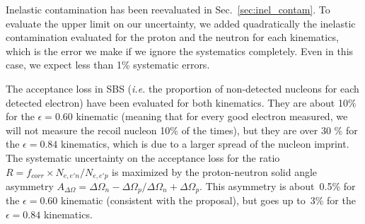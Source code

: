 Inelastic contamination has been reevaluated in Sec.~\ref{sec:inel_contam}. To evaluate the upper limit on our uncertainty, we added quadratically the inelastic contamination evaluated for the proton and the neutron for each kinematics, which is the error we make if we ignore the systematics completely. Even in this case, we expect less than 1\% systematic errors.

The acceptance loss in SBS ({\it i.e.} the proportion of non-detected nucleons for each detected electron) have been evaluated for both kinematics.
They are about 10\% for the $\epsilon = 0.60$ kinematic (meaning that for every good electron measured, we will not measure the recoil nucleon 10\% of the times), but they are over 30 \% for the $\epsilon= 0.84$ kinematics, which is due to a larger spread of the nucleon imprint.
The systematic uncertainty on the acceptance loss for the ratio $R = f_{corr} \times N_{e,e'n}/N_{e,e'p}$ is maximized by the proton-neutron solid angle asymmetry $A_{\Delta\Omega} = {\Delta\Omega_n-\Delta\Omega_p}/{\Delta\Omega_n+\Delta\Omega_p}$.
This asymmetry is about~0.5\% for the $\epsilon = 0.60$ kinematic (consistent with the \gmn proposal), but goes up to~3\% for the $\epsilon= 0.84$ kinematics.






